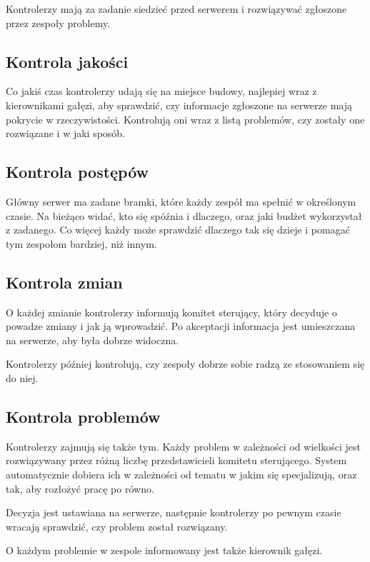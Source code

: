 Kontrolerzy mają za zadanie siedzieć przed serwerem i rozwiązywać zgłoszone przez zespoły problemy.

\subsection{Kontrola jakości}
Co jakiś czas kontrolerzy udają się na miejsce budowy, najlepiej wraz z kierownikami gałęzi, aby sprawdzić, czy informacje zgłoszone na serwerze mają pokrycie w rzeczywistości.
Kontrolują oni wraz z listą problemów, czy zostały one rozwiązane i w jaki sposób.

\subsection{Kontrola postępów}
Główny serwer ma zadane bramki, które każdy zespół ma spełnić w określonym czasie. Na bieżąco widać, kto się spóźnia i dlaczego, oraz jaki budżet wykorzystał z zadanego.
Co więcej każdy może sprawdzić dlaczego tak się dzieje i pomagać tym zespołom bardziej, niż innym.

\subsection{Kontrola zmian}
O każdej zmianie kontrolerzy informują komitet sterujący, który decyduje o powadze zmiany i jak ją wprowadzić.
Po akceptacji informacja jest umieszczana na serwerze, aby była dobrze widoczna.

Kontrolerzy później kontrolują, czy zespoły dobrze sobie radzą ze stosowaniem się do niej.

\subsection{Kontrola problemów}
Kontrolerzy zajmują się także tym. Każdy problem w zależności od wielkości jest rozwiązywany przez różną liczbę przedstawicieli komitetu sterującego.
System automatycznie dobiera ich w zależności od tematu w jakim się specjalizują, oraz tak, aby rozłożyć pracę po równo.

Decyzja jest ustawiana na serwerze, następnie kontrolerzy po pewnym czasie wracają sprawdzić, czy problem został rozwiązany.

O każdym problemie w zespole informowany jest także kierownik gałęzi.



